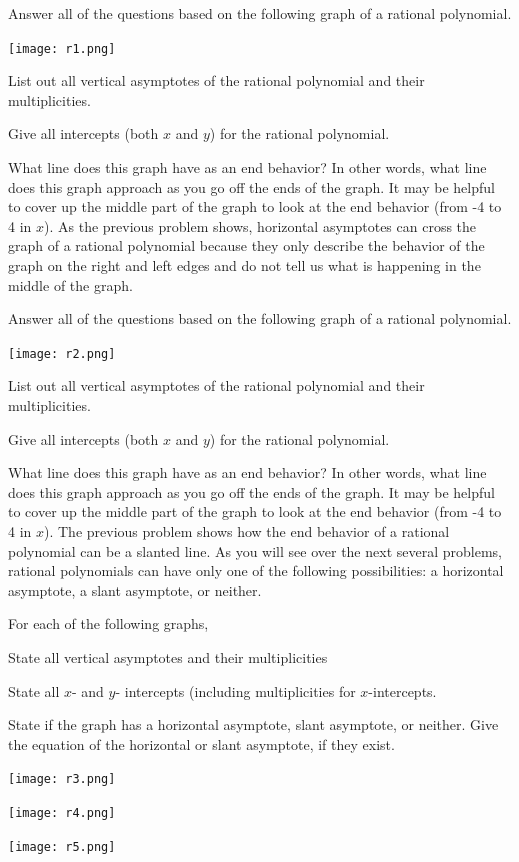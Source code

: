 \bq Answer all of the questions based on the following graph of a rational polynomial.
\begin{center} \texttt{[image: r1.png]} \end{center}
\be
\item List out all vertical asymptotes of the rational polynomial and their multiplicities.
\item Give all intercepts (both $x$ and $y$) for the rational polynomial.
\item What line does this graph have as an end behavior? In other words, what line does this graph approach as you go off the ends of the graph. It may be helpful to cover up the middle part of the graph to look at the end behavior (from -4 to 4 in $x$).
\ee
\eq
As the previous problem shows, horizontal asymptotes can cross the graph of a rational polynomial because they only describe the behavior of the graph on the right and left edges and do not tell us what is happening in the middle of the graph.

\bq Answer all of the questions based on the following graph of a rational polynomial.
\begin{center} \texttt{[image: r2.png]} \end{center}
\be
\item List out all vertical asymptotes of the rational polynomial and their multiplicities.
\item Give all intercepts (both $x$ and $y$) for the rational polynomial.
\item What line does this graph have as an end behavior? In other words, what line does this graph approach as you go off the ends of the graph. It may be helpful to cover up the middle part of the graph to look at the end behavior (from -4 to 4 in $x$).
\ee
\eq
The previous problem shows how the end behavior of a rational polynomial can be a slanted line. As you will see over the next several problems, rational polynomials can have only one of the following possibilities: a horizontal asymptote, a slant asymptote, or neither.

\bq For each of the following graphs,
\be
\item State all vertical asymptotes and their multiplicities
\item State all $x$- and $y$- intercepts (including multiplicities for $x$-intercepts.
\item State if the graph has a horizontal asymptote, slant asymptote, or neither. Give the equation of the horizontal or slant asymptote, if they exist.
\ee
\begin{center} \texttt{[image: r3.png]}

\texttt{[image: r4.png]}

\texttt{[image: r5.png]} \end{center}

